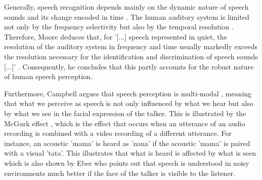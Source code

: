 \documentclass[11pt,a4paper,twoside]{article}
\theoremstyle{thmbreak}
\numberwithin{Theorem}{subsection}
\theoremstyle{defbreak}
\theoremstyle{remark}
\theoremstyle{remark}
\begin{document}
Generally, speech recognition depends mainly on the dynamic nature of speech sounds and its change encoded in time \cite{moore2008introduction}. The human auditory system is limited not only by the frequency selectivity but also by the temporal resolution \cite{moore2008introduction}. Therefore, Moore deduces that, for '[...] speech represented in quiet,  the resolution of the auditory system in frequency and time usually markedly exceeds the resolution necessary for the identification and discrimination of speech sounds [...]' \cite{moore2008introduction}. Consequently, he concludes that this partly accounts for the robust nature of human speech perception.

Furthermore, Campbell argues that speech perception is multi-modal  \cite{campbell2008processing}, meaning that what we perceive as speech is not only influenced by what we hear but also by what we see in the facial expression of the talker. 
This is illustrated by the McGurk effect \cite{mcgurk1976hearing}, which is the effect that occurs when an utterance of an audio recording is combined with a video recording of a  different utterance. For instance, an acoustic 'mama' is heard as 'nana' if the acoustic 'mama' is paired with a visual 'tata'. This illustrates that  what is heard is affected by what is seen which is also shown by Eber \cite{eber} who points out that speech is understood in noisy environments much better if the face of the talker is visible to the listener.
\end{document}
